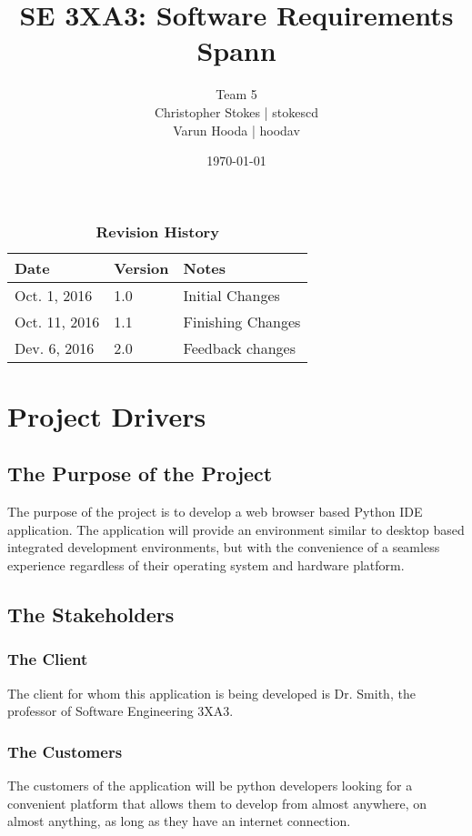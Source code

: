 \documentclass[12pt, titlepage]{article}
\title{SE 3XA3: Software Requirements\\Spann}
\author{Team 5
		\\ Christopher Stokes | stokescd
		\\ Varun Hooda | hoodav
}
\date{\today}
\begin{document}
\maketitle

\tableofcontents
\listoftables
\listoffigures

\begin{table}[bp]
\caption{\bf Revision History}
\begin{tabularx}{\textwidth}{p{3cm}p{2cm}X}
\toprule {\bf Date} & {\bf Version} & {\bf Notes}\\
\midrule
Oct. 1, 2016 & 1.0 & Initial Changes\\
Oct. 11, 2016 & 1.1 & Finishing Changes\\
  Dev. 6, 2016 & 2.0 & Feedback changes\\
\bottomrule
\end{tabularx}
\end{table}

\newpage


\section{Project Drivers}

  \subsection{The Purpose of the Project}
  The purpose of the project is to develop a web browser based Python IDE
  application. The application will provide an environment similar to desktop
  based integrated development environments, but with the convenience of a
	seamless experience regardless of their operating system and hardware
	platform.

  \subsection{The Stakeholders}

    \subsubsection{The Client}
    The client for whom this application is being developed is Dr. Smith, the
    professor of Software Engineering 3XA3.

    \subsubsection{The Customers}
    The customers of the application will be python developers looking for a
    convenient platform that allows them to develop from almost anywhere, on
    almost anything, as long as they have an internet connection.
\end{document}
